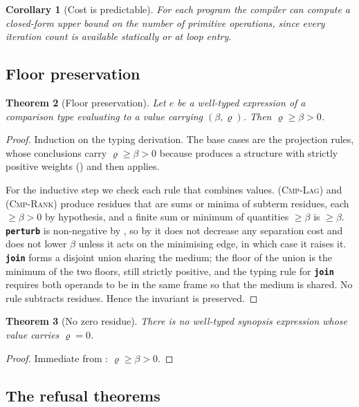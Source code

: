 \documentclass[11pt,twocolumn,a4paper]{article}
\theoremstyle{plain}
\newtheorem{theorem}{Theorem}[section]
\newtheorem{corollary}[theorem]{Corollary}
\theoremstyle{definition}
\theoremstyle{remark}
\newcommand{\flo}{\beta}                       %
\newcommand{\Res}{\varrho}                     %
\newcommand{\kw}[1]{\texttt{\textbf{#1}}}
\begin{document}
\begin{corollary}[Cost is predictable]
For each program the compiler can compute a closed-form upper bound on
the number of primitive operations, since every iteration count is
available statically or at loop entry.
\end{corollary}

\subsection{Floor preservation}

\begin{theorem}[Floor preservation]
\label{thm:floorpres}
Let $e$ be a well-typed expression of a comparison type evaluating to a
value carrying $(\flo,\Res)$. Then $\Res\ge\flo>0$.
\end{theorem}

\begin{proof}
Induction on the typing derivation. The base cases are the projection
rules, whose conclusions carry $\Res\ge\flo>0$ because
 produces a structure with strictly positive
weights () and  then applies.

For the inductive step we check each rule that combines values.
\textsc{(Cmp-Lag)} and \textsc{(Cmp-Rank)} produce residues that are
sums or minima of subterm residues, each $\ge\flo>0$ by hypothesis, and
a finite sum or minimum of quantities $\ge\flo$ is $\ge\flo$.
\kw{perturb} is non-negative by , so by
 it does not decrease any separation cost and does
not lower $\flo$ unless it acts on the minimising edge, in which case it
raises it. \kw{join} forms a disjoint union sharing the medium; the
floor of the union is the minimum of the two floors, still strictly
positive, and the typing rule for \kw{join} requires both operands to be
in the same frame so that the medium is shared. No rule subtracts
residues. Hence the invariant is preserved.
\end{proof}

\begin{theorem}[No zero residue]
\label{thm:nozero}
There is no well-typed synopsis expression whose value carries
$\Res=0$.
\end{theorem}
\begin{proof}
Immediate from : $\Res\ge\flo>0$.
\end{proof}

\subsection{The refusal theorems}
\end{document}
